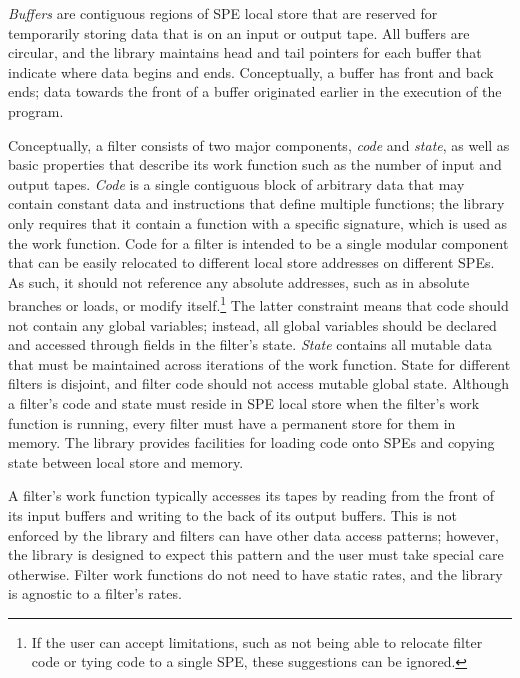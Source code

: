 \emph{Buffers} are contiguous regions of SPE local store that are reserved for temporarily storing data that is on an input or output tape. All buffers are circular, and the library maintains head and tail pointers for each buffer that indicate where data begins and ends. Conceptually, a buffer has front and back ends; data towards the front of a buffer originated earlier in the execution of the program.

Conceptually, a filter consists of two major components, \emph{code} and \emph{state}, as well as basic properties that describe its work function such as the number of input and output tapes. \emph{Code} is a single contiguous block of arbitrary data that may contain constant data and instructions that define multiple functions; the library only requires that it contain a function with a specific signature, which is used as the work function. Code for a filter is intended to be a single modular component that can be easily relocated to different local store addresses on different SPEs. As such, it should not reference any absolute addresses, such as in absolute branches or loads, or modify itself.\footnote{If the user can accept limitations, such as not being able to relocate filter code or tying code to a single SPE, these suggestions can be ignored.} The latter constraint means that code should not contain any global variables; instead, all global variables should be declared and accessed through fields in the filter's state. \emph{State} contains all mutable data that must be maintained across iterations of the work function. State for different filters is disjoint, and filter code should not access mutable global state. Although a filter's code and state must reside in SPE local store when the filter's work function is running, every filter must have a permanent store for them in memory. The library provides facilities for loading code onto SPEs and copying state between local store and memory.

A filter's work function typically accesses its tapes by reading from the front of its input buffers and writing to the back of its output buffers. This is not enforced by the library and filters can have other data access patterns; however, the library is designed to expect this pattern and the user must take special care otherwise. Filter work functions do not need to have static rates, and the library is agnostic to a filter's rates.

